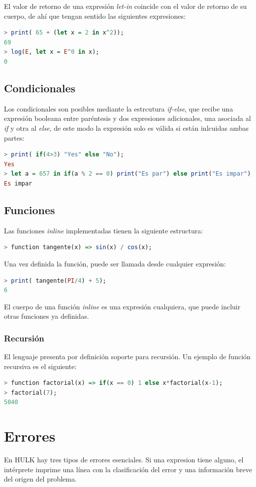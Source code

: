 \documentclass[a4paper, 12pt]{article}
\begin{document}
El valor de retorno de una  expresión \textit{let-in} coincide con el valor de retorno de su cuerpo, de ahí que tengan sentido las siguientes expresiones:
\begin{lstlisting}[language= Haskell]
> print( 65 + (let x = 2 in x^2));
69
> log(E, let x = E^0 in x);
0
\end{lstlisting}


\subsection{Condicionales}
Los condicionales son posibles mediante la estrcutura \textit{if-else}, que recibe una expresión booleana entre paréntesis y dos expresiones adicionales, una asociada al \textit{if} y otra al \textit{else}, de este modo la expresión solo es válida si están inlcuidas ambas partes:
\begin{lstlisting}[language= Haskell]
> print( if(4>3) "Yes" else "No");
Yes
> let a = 657 in if(a % 2 == 0) print("Es par") else print("Es impar");
Es impar
\end{lstlisting}

\subsection{Funciones}
Las funciones \textit{inline} implementadas tienen la siguiente estructura:
 \begin{lstlisting}[language= Haskell]
> function tangente(x) => sin(x) / cos(x);
\end{lstlisting}
Una vez definida la función, puede ser llamada desde cualquier expresión:
\begin{lstlisting}[language= Haskell]
> print( tangente(PI/4) + 5);
6
\end{lstlisting}
El cuerpo de una función \textit{inline} es una expresión cualquiera, que puede incluir otras funciones ya definidas.
\subsubsection{Recursión}
El lenguaje presenta por definición soporte para recursión. Un ejemplo de función recursiva es el siguiente:
\begin{lstlisting}[language= Haskell]
> function factorial(x) => if(x == 0) 1 else x*factorial(x-1);  
> factorial(7);
5040
\end{lstlisting}

\newpage


\section{Errores}
En HULK hay tres tipos de errores esenciales. Si una expresion tiene alguno, el intérprete imprime una línea con la clasificación del error y una información breve del origen del problema.
\end{document}
